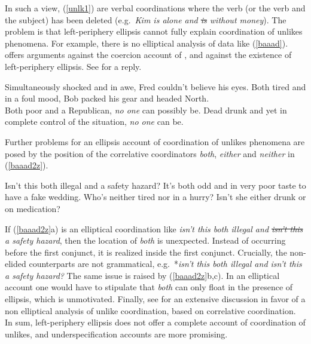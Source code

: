 \documentclass[output=paper
                ,modfonts
                ,nonflat
	        ,collection
	        ,collectionchapter
	        ,collectiontoclongg
 	        ,biblatex
                ,babelshorthands
                ,newtxmath
                ,draftmode
                ,colorlinks, citecolor=brown
]{./langsci/langscibook}
\begin{document}
{\noindent
In such a view, (\ref{unlk1})  are verbal coordinations where the verb (or the verb and the subject) has been deleted  (e.g.\ \emph{Kim is alone and \sout{is} without money}).  The problem is that  left-periphery ellipsis  cannot  fully explain 
coordination of unlikes phenomena. For example, there is no elliptical analysis of  data like (\ref{baaad}). \citet{levine11} offers  arguments against
the coercion account of \citet{chaves06},
and against  the existence of left-periphery ellipsis. See \cite{yatabe12} for a reply.

\begin{exe}
\ex
\begin{xlista}
\ex Simultaneously shocked and in awe, Fred couldn't believe his eyes.
\ex  Both tired and in a foul mood, Bob packed his gear and headed North.\\
\citep[]{chaves06}
\ex Both poor and a Republican, \emph{no one} can possibly be.
\ex  Dead drunk and yet in complete control of the situation, \emph{no one} can be.\\
\citep[]{levine11}
\end{xlista}\label{baaad}
\end{exe}



\noindent
Further problems for an  ellipsis account of coordination
of unlikes phenomena are posed by the position of  the 
correlative coordinators \emph{both}, \emph{either} and
 \emph{neither} in (\ref{baaad2z}).

\begin{exe}
\ex
\begin{xlista}
\ex Isn't this both illegal and a safety hazard?
\ex It's both odd and in very poor taste to have a fake wedding.
\ex Who's neither tired nor in a hurry?
\ex Isn't she either drunk or on medication?
\end{xlista}\label{baaad2z}
\end{exe}



\noindent
 If (\ref{baaad2z}a) is an elliptical coordination
like \emph{isn't this both illegal and \sout{isn't this} a safety
hazard}, then the location of \emph{both} is unexpected. Instead of
occurring before the first conjunct, it is realized inside the first
conjunct. Crucially, the non-elided counterparts are not
grammatical, e.g.\ *\emph{isn't this both illegal and isn't this a
safety hazard?} The same issue is raised by (\ref{baaad2z}b,c). In
an elliptical account  one would have to stipulate
that \emph{both} can only float in the presence of ellipsis, which
is unmotivated.
Finally, see \citet{Mouret:07} for  an extensive discussion in favor of a non elliptical analysis of unlike coordination, based on correlative coordination.
In sum, left-periphery ellipsis does not 
offer a complete account of coordination of unlikes, and underspecification
accounts are more promising.




}
\end{document}
